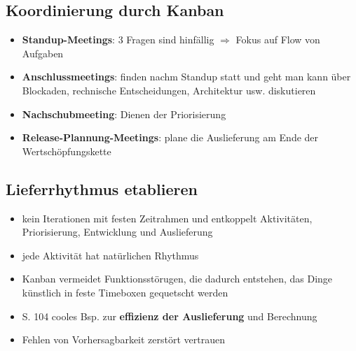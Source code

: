 \subsection{Koordinierung durch Kanban}
\begin{itemize}
  \item \textbf{Standup-Meetings}: 3 Fragen sind hinfällig $\Rightarrow$  Fokus auf Flow von Aufgaben
  \item \textbf{Anschlussmeetings}: finden nachm Standup statt und geht man kann über Blockaden,
    rechnische Entscheidungen, Architektur usw. diskutieren
  \item \textbf{Nachschubmeeting}: Dienen der Priorisierung
  \item \textbf{Release-Plannung-Meetings}: plane die Auslieferung am Ende der Wertschöpfungskette
\end{itemize}


\subsection{Lieferrhythmus etablieren}
\begin{itemize}
  \item kein Iterationen mit festen Zeitrahmen und entkoppelt Aktivitäten, Priorisierung,
    Entwicklung und Auslieferung
  \item jede Aktivität hat natürlichen Rhythmus
  \item Kanban vermeidet Funktionsstörugen, die dadurch entstehen, das Dinge künstlich in feste
    Timeboxen gequetscht werden
  \item S. 104 cooles Bsp. zur \textbf{effizienz der Auslieferung} und Berechnung
  \item Fehlen von Vorhersagbarkeit zerstört vertrauen
\end{itemize}


